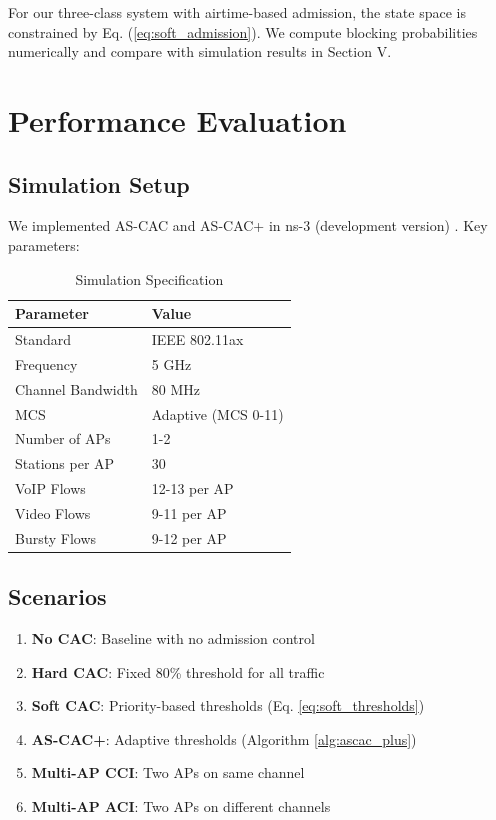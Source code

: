 \documentclass[conference]{IEEEtran}
\begin{document}
For our three-class system with airtime-based admission, the state space is constrained by Eq. (\ref{eq:soft_admission}). We compute blocking probabilities numerically and compare with simulation results in Section V.

\section{Performance Evaluation}

\subsection{Simulation Setup}

We implemented AS-CAC and AS-CAC+ in ns-3 (development version) \cite{14}. Key parameters:

\begin{table}[h]
\centering
\caption{Simulation Specification}
\label{tab:params}
\begin{tabular}{ll}
\toprule
\textbf{Parameter} & \textbf{Value} \\
\midrule
Standard & IEEE 802.11ax \\
Frequency & 5 GHz \\
Channel Bandwidth & 80 MHz \\
MCS & Adaptive (MCS 0-11) \\
Number of APs & 1-2 \\
Stations per AP & 30 \\
VoIP Flows & 12-13 per AP \\
Video Flows & 9-11 per AP \\
Bursty Flows & 9-12 per AP \\
\bottomrule
\end{tabular}
\end{table}

\subsection{Scenarios}

\begin{enumerate}
    \item \textbf{No CAC}: Baseline with no admission control
    \item \textbf{Hard CAC}: Fixed 80\% threshold for all traffic
    \item \textbf{Soft CAC}: Priority-based thresholds (Eq. \ref{eq:soft_thresholds})
    \item \textbf{AS-CAC+}: Adaptive thresholds (Algorithm \ref{alg:ascac_plus})
    \item \textbf{Multi-AP CCI}: Two APs on same channel
    \item \textbf{Multi-AP ACI}: Two APs on different channels
\end{enumerate}
\end{document}
